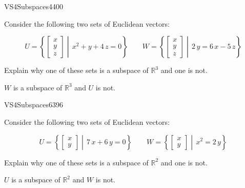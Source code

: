 \begin{exercise}{VS4}{Subspaces}{4400} 
\begin{exerciseStatement} 

Consider the following two sets of Euclidean vectors: 

 \[
          U=\left\{ \left[\begin{array}{c}
x \\
y \\
z
\end{array}\right] \middle|\,x^{2} + y + 4 \, z = 0\right\} \hspace{2em}  W=\left\{ \left[\begin{array}{c}
x \\
y \\
z
\end{array}\right] \middle|\,2 \, y = 6 \, x - 5 \, z\right\}
    \] 

 Explain why one of these sets is a subspace of \(\mathbb{R}^3\) and one is not. 

 \end{exerciseStatement}
 \begin{exerciseAnswer} 

\(W\) is a subspace of \(\mathbb{R}^3\) and \(U\) is not.

 \end{exerciseAnswer}
 \end{exercise}


\begin{exercise}{VS4}{Subspaces}{6396} 
\begin{exerciseStatement} 

Consider the following two sets of Euclidean vectors: 

 \[
          U=\left\{ \left[\begin{array}{c}
x \\
y
\end{array}\right] \middle|\,7 \, x + 6 \, y = 0\right\} \hspace{2em}  W=\left\{ \left[\begin{array}{c}
x \\
y
\end{array}\right] \middle|\,x^{2} = 2 \, y\right\}
    \] 

 Explain why one of these sets is a subspace of \(\mathbb{R}^2\) and one is not. 

 \end{exerciseStatement}
 \begin{exerciseAnswer} 

\(U\) is a subspace of \(\mathbb{R}^2\) and \(W\) is not.

 \end{exerciseAnswer}
 \end{exercise}


